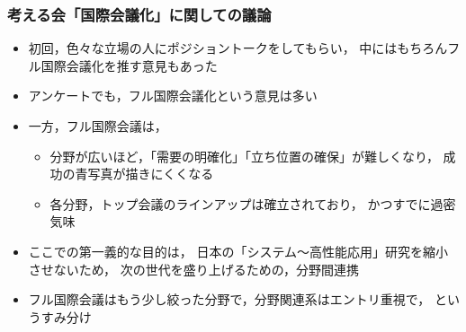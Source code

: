 \documentclass[12pt,dvipdfmx]{beamer}
\begin{document}
\begin{frame}
\frametitle{考える会「国際会議化」に関しての議論}

\begin{itemize}
\item 初回，色々な立場の人にポジショントークをしてもらい，
  中にはもちろんフル国際会議化を推す意見もあった
\item アンケートでも，フル国際会議化という意見は多い
\item 一方，フル国際会議は，
  \begin{itemize}
  \item 分野が広いほど，「需要の明確化」「立ち位置の確保」が難しくなり，
    成功の青写真が描きにくくなる
  \item 各分野，トップ会議のラインアップは確立されており，
    かつすでに過密気味
  \end{itemize}
\item ここでの第一義的な目的は，
  日本の「システム〜高性能応用」研究を縮小させないため，
  次の世代を盛り上げるための，分野間連携
\item フル国際会議はもう少し絞った分野で，分野関連系はエントリ重視で，
  というすみ分け
\end{itemize}
\end{frame}
\end{document}
